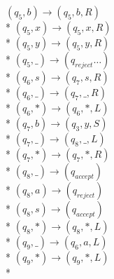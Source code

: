 \documentclass{article}
\begin{document}
\begin{multicols}{3}
\begin{addmargin}[1em]{0em}
        $(q_5, b) \rightarrow (q_5, b, R) $\\*
        $(q_5, x) \rightarrow (q_5, x, R) $\\*
        $(q_5, y) \rightarrow (q_5, y, R) $\\*
        $(q_5, \_) \rightarrow (q_{reject}\dots) $\\*
        $(q_6, s) \rightarrow (q_7, s, R) $\\*
        $(q_6, \_) \rightarrow (q_7, \_, R) $\\*
        $(q_6, *) \rightarrow (q_6, *, L) $\\*
        $(q_7, b) \rightarrow (q_3, y, S) $\\*
        $(q_7, \_) \rightarrow (q_8, \_, L) $\\*
        $(q_7, *) \rightarrow (q_7, *, R) $\\*
        $(q_8, \_) \rightarrow (q_{accept}) $\\*
        $(q_8, a) \rightarrow (q_{reject}) $\\*
        $(q_8, s) \rightarrow (q_{accept}) $\\*
        $(q_8, *) \rightarrow (q_8, *, L) $\\*
        $(q_9, \_) \rightarrow (q_6, a, L)$\\*
        $(q_9, *) \rightarrow (q_9, *, L)$\\*
    \end{addmargin}
\end{multicols}
\end{document}
